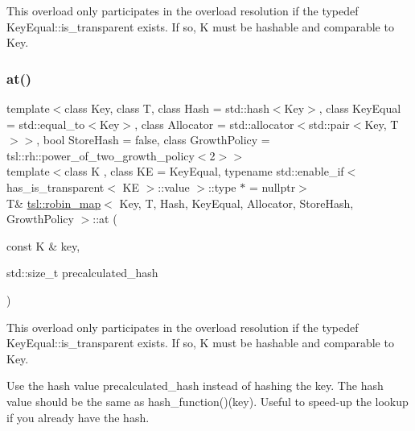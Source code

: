 This overload only participates in the overload resolution if the typedef Key\+Equal\+::is\+\_\+transparent exists. If so, K must be hashable and comparable to Key. \mbox{\label{classtsl_1_1robin__map_a9404d5336af0f621773a83da4c65a665}} 
\subsubsection{\texorpdfstring{at()}{at()}\hspace{0.1cm}{\footnotesize\ttfamily [4/6]}}
{\footnotesize\ttfamily template$<$class Key, class T, class Hash = std\+::hash$<$\+Key$>$, class Key\+Equal = std\+::equal\+\_\+to$<$\+Key$>$, class Allocator = std\+::allocator$<$std\+::pair$<$\+Key, T$>$$>$, bool Store\+Hash = false, class Growth\+Policy = tsl\+::rh\+::power\+\_\+of\+\_\+two\+\_\+growth\+\_\+policy$<$2$>$$>$ \\
template$<$class K , class KE  = Key\+Equal, typename std\+::enable\+\_\+if$<$ has\+\_\+is\+\_\+transparent$<$ K\+E $>$\+::value $>$\+::type $\ast$  = nullptr$>$ \\
T\& \mbox{\hyperlink{classtsl_1_1robin__map}{tsl\+::robin\+\_\+map}}$<$ Key, T, Hash, Key\+Equal, Allocator, Store\+Hash, Growth\+Policy $>$\+::at (\begin{DoxyParamCaption}\item[{const K \&}]{key,  }\item[{std\+::size\+\_\+t}]{precalculated\+\_\+hash }\end{DoxyParamCaption})\hspace{0.3cm}{\ttfamily [inline]}}





This overload only participates in the overload resolution if the typedef Key\+Equal\+::is\+\_\+transparent exists. If so, K must be hashable and comparable to Key.

Use the hash value \textquotesingle{}precalculated\+\_\+hash\textquotesingle{} instead of hashing the key. The hash value should be the same as hash\+\_\+function()(key). Useful to speed-\/up the lookup if you already have the hash. \mbox{\label{classtsl_1_1robin__map_afb148e953f4f5a2e639f3e6d72dbab6d}} 

